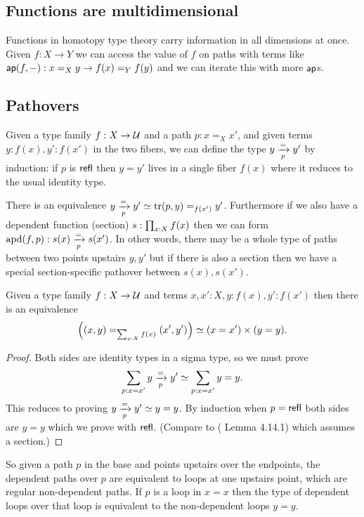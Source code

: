 \documentclass[12pt]{article}
\begin{document}
\subsection{Functions are multidimensional}

Functions in homotopy type theory carry information in all dimensions at once. Given \( f:X\to Y \) we can access the value of \( f \) on paths with terms like \( \textsf{ap}(f,-):x=_Xy\to f(x)=_Y f(y) \) and we can iterate this with more \( \textsf{ap} \)s. 

\subsection{Pathovers}
Given a type family \( f:X\to \mathcal{U} \) and a path \( p:x=_X x' \), and given terms \( y:f(x), y':f(x') \) in the two fibers, we can define the type \( y\xrightarrow[{p}]{=}y' \) by induction: if \( p \) is \( \textsf{refl} \) then \( y=y' \) lives in a single fiber \( f(x) \) where it reduces to the usual identity type.

There is an equivalence \( y\xrightarrow[{p}]{=}y'\simeq \mathrm{tr}(p,y)=_{f(x')}y' \). Furthermore if we also have a dependent function (section) \( s:\prod_{x:X} f(x) \) then we can form \( \mathrm{apd}(f,p):s(x)\xrightarrow[{p}]{=}s(x') \). In other words, there may be a whole type of paths between two points upstairs \( y, y' \) but if there is also a section then we have a special section-specific pathover between \( s(x), s(x') \).

\begin{mylemma}
Given a type family \( f:X\to\mathcal{U} \) and terms \( x,x':X, y:f(x), y':f(x') \) then there is an equivalence 
\[ 
  \left((x,y) =_{\sum_{x:X}f(x)} (x',y')\right) \simeq 
  (x=x')\times (y=y).
\]
\end{mylemma}
\begin{proof}
Both sides are identity types in a sigma type, so we must prove
\[ 
\sum_{p:x=x'}y\xrightarrow[{p}]{=}y' \simeq \sum_{p:x=x'}y=y.
\] 
This reduces to proving \( y\xrightarrow[{p}]{=}y'\simeq y=y  \). By induction when \( p=\textsf{refl} \) both sides are \( y=y \) which we prove with \( \textsf{refl} \). (Compare to (\cite{Symmetry} Lemma 4.14.1) which assumes a section.)
\end{proof}

So given a path \( p \) in the base and points upstairs over the endpoints, the dependent paths over \( p \) are equivalent to loops at one upstairs point, which are regular non-dependent paths. If \( p \) is a loop in \( x=x \) then the type of dependent loops over that loop is equivalent to the non-dependent loops \( y=y \).
\end{document}
